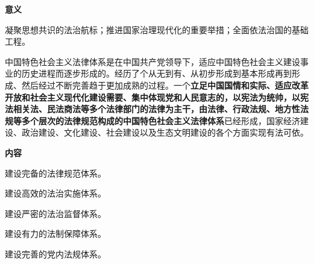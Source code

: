 {\textbf{意义}}

{凝聚思想共识的法治航标；推进国家治理现代化的重要举措；全面依法治国的基础工程。}

{{中国特色社会主义法律体系是在中国共产党领导下，适应中国特色社会主义建设事业的历史进程而逐步形成的。经历了个从无到有、从初步形成到基本形成再到形成、然后经过不断完善趋于更加成熟的过程。}{一个}\textbf{立足中国国情和实际、适应改革开放和社会主义现代化建设需要、集中体现党和人民意志的，以宪法为统帅，以宪法相关法、民法商法等多个法律部门的法律为主干，由法律、行政法规、地方性法规等多个层次的法律规范构成的}{\textbf{中国特色社会主义法律体}}{\textbf{系}}{已经形成}{，国家经济建设、政治建设、文化建设、社会建设以及生态文明建设的各个方面实现有法可依。}\\
}

{\textbf{内容}}

{建设完备的法律规范体系。}

{建设高效的法治实施体系。}

{建设严密的法治监督体系。}

{建设有力的法制保障体系。}

{建设完善的党内法规体系。}
